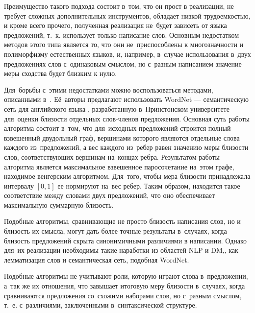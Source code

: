Преимущество такого подхода состоит в~том, что он прост в реализации, не требует
сложных дополнительных инструментов, обладает низкой трудоемкостью, и кроме всего прочего,
 полученная реализация не~будет зависеть от языка предложений, 
т.~к. использует только написание слов.
Основным недостатком методов этого типа является то, что они  не~приспособлены к многозначности и полиморфизму естественных языков, 
и, например, в~случае  использования в~двух предложениях слов с~одинаковым смыслом, но с~разным написанием 
значение меры сходства будет близким к нулю.

Для~борьбы с~этими недостатками можно воспользоваться методами, описанными в~\cite{wordnetSim}.
Её~авторы предлагают использовать WordNet --- семантическую сеть для английского языка \cite{wordnet}, 
разработанную в~Принстонском университете для~оценки близости отдельных слов-членов предложения.
Основная суть работы алгоритма состоит в~том, 
что для~исходных предложений строится полный взвешенный двудольный граф, %
вершинами которого являются отдельные слова каждого из~предложений, 
а вес каждого из~ребер равен значению меры близости слов,
соответствующих вершинам на~концах ребра. 
Результатом работы алгоритма является максимальное взвешенное паросочетание на~этом графе, 
находимое венгерским алгоритмом. %
Для~того, чтобы мера близости принадлежала интервалу $[0,1]$ ее нормируют на~вес ребер.
Таким образом, находится такое соответствие между словами двух предложений,
что оно обеспечивает максимальную суммарную близость.

Подобные алгоритмы, сравнивающие не просто близость написания слов, 
но и близость их смысла, могут дать более точные результаты в~случаях, 
когда близость предложений скрыта синонимичными различиями в написании.
Однако для~их реализации необходимы такие наработки из областей NLP и DM,, 
как лемматизация слов и семантическая сеть, подобная WordNet\cite{wordnet}.


Подобные алгоритмы не учитывают роли, которую играют слова в~предложении,
а~так же их отношения, что завышает итоговую меру близости в~случаях,
когда сравниваются предложения со~схожими наборами слов, но с~разным смыслом,
т.~е. с~различиями, заключенными в~синтаксической структуре.

